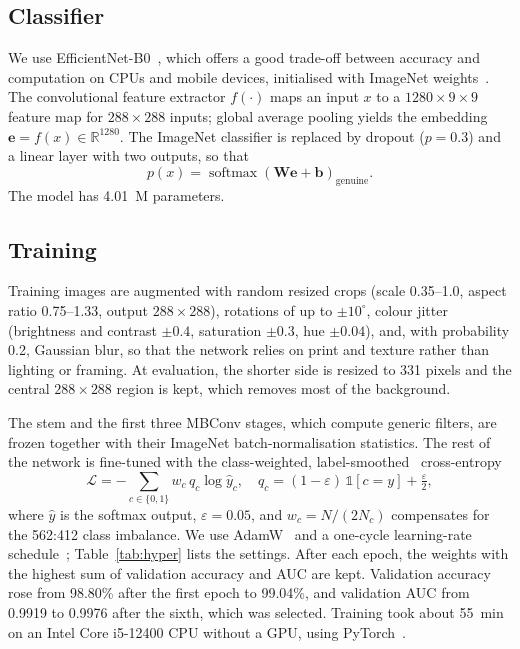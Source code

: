 \documentclass[journal]{IEEEtran}
\begin{document}
\subsection{Classifier}
\label{sec:classifier}
We use EfficientNet-B0~\cite{tan2019efficientnet}, which offers a good trade-off between
accuracy and computation on CPUs and mobile devices, initialised with ImageNet
weights~\cite{deng2009imagenet}. The convolutional feature extractor $f(\cdot)$ maps an
input $x$ to a $1280\times9\times9$ feature map for $288\times288$ inputs; global average
pooling yields the embedding $\mathbf{e}=f(x)\in\mathbb{R}^{1280}$. The ImageNet classifier
is replaced by dropout ($p=0.3$) and a linear layer with two outputs, so that
\begin{equation}
p(x) = \operatorname{softmax}\!\left(\mathbf{W}\mathbf{e}+\mathbf{b}\right)_{\text{genuine}} .
\label{eq:prob}
\end{equation}
The model has 4.01~M parameters.

\subsection{Training}
\label{sec:training}
Training images are augmented with random resized crops (scale 0.35--1.0, aspect ratio
0.75--1.33, output $288\times288$), rotations of up to $\pm10^\circ$, colour jitter
(brightness and contrast $\pm0.4$, saturation $\pm0.3$, hue $\pm0.04$), and, with
probability 0.2, Gaussian blur, so that the network relies on print and texture rather
than lighting or framing. At evaluation, the shorter side is resized to 331 pixels and
the central $288\times288$ region is kept, which removes most of the background.

The stem and the first three MBConv stages, which compute generic filters, are frozen
together with their ImageNet batch-normalisation statistics. The rest of the network is
fine-tuned with the
class-weighted, label-smoothed~\cite{szegedy2016inception} cross-entropy
\begin{equation}
\mathcal{L} = -\sum_{c\in\{0,1\}} w_c\, q_c \log \hat{y}_c, \quad
q_c = (1-\varepsilon)\,\mathbb{1}[c=y] + \tfrac{\varepsilon}{2},
\label{eq:loss}
\end{equation}
where $\hat{y}$ is the softmax output, $\varepsilon=0.05$, and $w_c=N/(2N_c)$ compensates
for the 562:412 class imbalance. We use AdamW~\cite{loshchilov2019adamw} and a one-cycle
learning-rate schedule~\cite{smith2019superconvergence}; Table~\ref{tab:hyper} lists the
settings. After each epoch, the weights with the highest sum of validation accuracy
and AUC are kept. Validation accuracy
rose from 98.80\% after the first epoch to 99.04\%, and validation AUC from 0.9919 to
0.9976 after the sixth, which was selected. Training took about 55~min on an Intel Core
i5-12400 CPU without a GPU, using PyTorch~\cite{paszke2019pytorch}.
\end{document}
